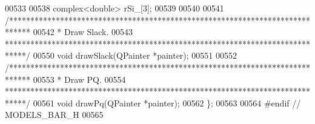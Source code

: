 \begin{DoxyCode}
00533 
00538   complex<\textcolor{keywordtype}{double}> rSi\_[3];
00539 
00540 
00541   \textcolor{comment}{/*****************************************************************************}
00542 \textcolor{comment}{  * Draw Slack.}
00543 \textcolor{comment}{  *****************************************************************************/}
00550   \textcolor{keywordtype}{void} drawSlack(QPainter *painter);
00551 
00552   \textcolor{comment}{/*****************************************************************************}
00553 \textcolor{comment}{  * Draw PQ.}
00554 \textcolor{comment}{  *****************************************************************************/}
00561   \textcolor{keywordtype}{void} drawPq(QPainter *painter);
00562 \};
00563 
00564 \textcolor{preprocessor}{#endif  // MODELS\_BAR\_H}
00565 
\end{DoxyCode}
